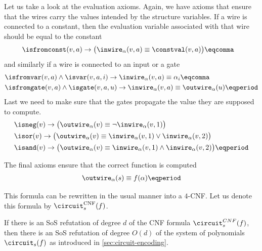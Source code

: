 Let us take a look at the evaluation axioms. Again, we have axioms
that ensure that the wires carry the values intended by the structure
variables. If a wire is connected to a constant, then the evaluation
variable associated with that wire should be equal to the constant
\begin{align}
  &\isfromconst(v, a)
    \rightarrow
    \big(\inwire_{
    \alpha}(v, a) \equiv \constval(v, a)\big) \eqcomma
\end{align}
and similarly if a wire is connected to an input or a gate
\begin{align}
  &\isfromvar(v, a) \wedge \isvar(v, a, i)
    \rightarrow
    \inwire_{\alpha}(v, a) \equiv \alpha_i \eqcomma\\
  &\isfromgate(v, a) \wedge \isgate(v, a, u)
    \rightarrow
    \inwire_{\alpha}(v, a) \equiv \outwire_{\alpha}(u) \eqperiod
\end{align}
Last we need to make sure that the gates propagate the value they are
supposed to compute.
\begin{align}
  &\isneg(v) \rightarrow
    \big(\outwire_{\alpha}(v) \equiv \neg \inwire_{\alpha}(v, 1)\big)\\
  &\isor(v) \rightarrow
    \big(\outwire_{\alpha}(v) \equiv \inwire_{\alpha}(v, 1) \vee \inwire_{\alpha}(v, 2)\big)\\
  &\isand(v) \rightarrow
    \big(\outwire_{\alpha}(v) \equiv \inwire_{\alpha}(v, 1) \wedge
    \inwire_{\alpha}(v, 2)\big)
    \eqperiod
\end{align}

The final axioms ensure that the correct function is computed
\begin{align}
  \outwire_{\alpha}(s) \equiv f(\alpha) \eqperiod
\end{align}

This formula can be rewritten in the usual manner into a $4$-CNF. Let
us denote this formula by $\circuit^{\mathrm{CNF}}_s(f)$.



\begin{proposition}
  \label{prop:cnf-poly}
  If there is an SoS refutation of degree $d$ of the CNF formula
  $\circuit^{CNF}_s(f)$, then there is an SoS refutation of degree
  $O(d)$ of the system of polynomials $\circuit_s(f)$ as introduced in
  \cref{sec:circuit-encoding}.
\end{proposition}

